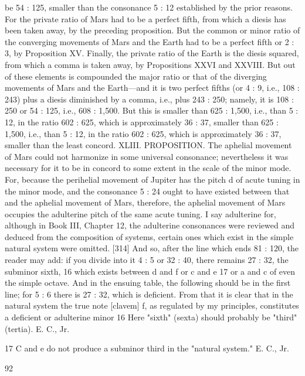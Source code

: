 \documentclass{article}
\begin{document}
be 54 : 125, smaller than the consonance 5 : 12 established by the prior
reasons.
For the private ratio of Mars had to be a perfect fifth, from which a diesis
has been taken away, by the preceding proposition. But the common or
minor ratio of the converging movements of Mars and the Earth had to
be a perfect fifth or 2 : 3, by Proposition XV. Finally, the private ratio of
the Earth is the diesis squared, from which a comma is taken away, by
Propositions XXVI and XXVIII. But out of these elements is
compounded the major ratio or that of the diverging movements of Mars
and the Earth—and it is two perfect fifths (or 4 : 9, i.e., 108 : 243) plus a
diesis diminished by a comma, i.e., plus 243 : 250; namely, it is 108 : 250
or 54 : 125, i.e., 608 : 1,500. But this is smaller than 625 : 1,500, i.e., than
5 : 12, in the ratio 602 : 625, which is approximately 36 : 37, smaller than
625 : 1,500, i.e., than 5 : 12, in the ratio 602 : 625, which is
approximately 36 : 37, smaller than the least concord.
XLIII. PROPOSITION. The aphelial movement of Mars could not
harmonize in some universal consonance; nevertheless it was necessary
for it to be in concord to some extent in the scale of the minor mode.
For, because the perihelial movement of Jupiter has the pitch d of acute
tuning in the minor mode, and the consonance 5 : 24 ought to have
existed between that and the aphelial movement of Mars, therefore, the
aphelial movement of Mars occupies the adulterine pitch of the same
acute tuning. I say adulterine for, although in Book III, Chapter 12, the
adulterine consonances were reviewed and deduced from the
composition of systems, certain ones which exist in the simple natural
system were omitted. [314] And so, after the line which ends 81 : 120, the
reader may add: if you divide into it 4 : 5 or 32 : 40, there remains 27 :
32, the subminor sixth, 16 which exists
between d and f or c and e 17 or a and c of even the simple octave. And in
the ensuing table, the following should be in the first line; for 5 : 6 there
is 27 : 32, which is deficient.
From that it is clear that in the natural system the true note [clavem] f,
as regulated by my principles, constitutes a deficient or adulterine minor
16 Here "sixth" (sexta) should probably be "third" (tertia). E. C., Jr.

17 C and e do not produce a subminor third in the "natural system." E. C., Jr.


92
\end{document}
